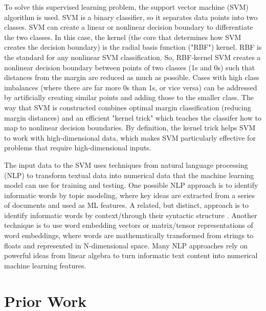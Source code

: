 \documentclass[10pt,twocolumn]{article}
\begin{document}
To solve this supervised learning problem, the support vector machine (SVM) algorithm is used. SVM is a binary classifier, so it separates data points into two classes. SVM can create a linear or nonlinear decision boundary to differentiate the two classes. In this case, the kernel (the core that determines how SVM creates the decision boundary) is the radial basis function ("RBF") kernel. RBF is the standard for any nonlinear SVM classification. So, RBF-kernel SVM creates a nonlinear decision boundary between points of two classes (1s and 0s) such that distances from the margin are reduced as much as possible. \cite{CortesVapnikSVM} Cases with high class imbalances (where there are far more 0s than 1s, or vice versa) can be addressed by artificially creating similar points and adding those to the smaller class. \cite{NVChawla} The way that SVM is constructed combines optimal margin classification (reducing margin distances) and an efficient "kernel trick" which teaches the classifer how to map to nonlinear decision boundaries. By definition, the kernel trick helps SVM to work with high-dimensional data, which makes SVM particularly effective for problems that require high-dimensional inputs. \cite{Joachims, Berbatova} 

The input data to the SVM uses techniques from natural language processing (NLP) to transform textual data into numerical data that the machine learning model can use for training and testing. One possible NLP approach is to identify informatic words by topic modeling, where key ideas are extracted from a series of documents and used as ML features. \cite{Ryan_51, Reuver} A related, but distinct, approach is to identify informatic words by context/through their syntactic structure \cite{Meidl, LDiCaro}. Another technique is to use word embedding vectors or matrix/tensor representations of word embeddings, where words are mathematically transformed from strings to floats and represented in N-dimensional space. \cite{Sifa_tensor} Many NLP approaches rely on powerful ideas from linear algebra to turn informatic text content into numerical machine learning features.

\section{Prior Work}

\end{document}
